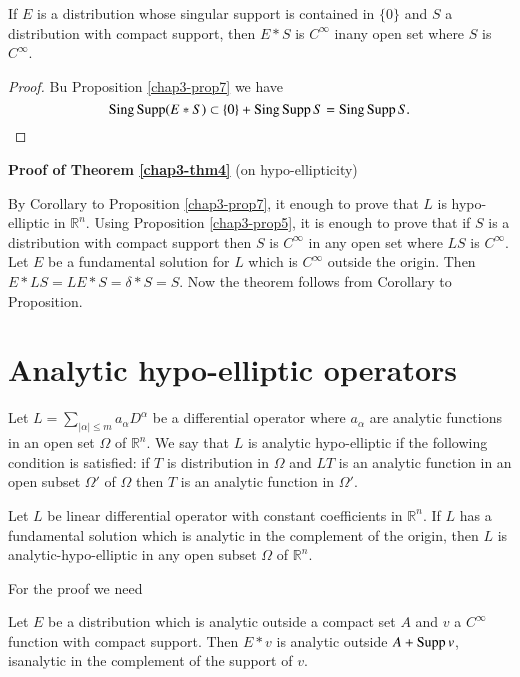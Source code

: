 \begin{coro*}
If $E$ is a distribution whose singular support is contained in
$\{0\}$ and $S$ a distribution with compact support, then $E\ast S$ is
$C^{\infty}$ in\pageoriginale any open set where $S$ is $C^{\infty}$.
\end{coro*}

\begin{proof}
Bu Proposition \ref{chap3-prop7} we have
$$
\operatorname{Sing} \operatorname{Supp} (E\ast S)\subset \{0\}+\operatorname{Sing} \operatorname{Supp} S=\operatorname{Sing} \operatorname{Supp} S.
$$
\end{proof}

\noindent
{\bf Proof of Theorem \ref{chap3-thm4}} (on hypo-ellipticity)

By Corollary to Proposition \ref{chap3-prop7}, it enough to prove that
$L$ is hypo-elliptic in $\mathbb{R}^{n}$. Using Proposition
\ref{chap3-prop5}, it is enough to prove that if $S$ is a distribution
with compact support then $S$ is $C^{\infty}$ in any open set where
$LS$ is $C^{\infty}$. Let $E$ be a fundamental solution for $L$ which
is $C^{\infty}$ outside the origin. Then $E\ast LS=LE\ast S=\delta\ast
S=S$. Now the theorem follows from Corollary to Proposition.

\section*{Analytic hypo-elliptic operators}

\begin{defi*}
Let $L=\sum\limits_{|\alpha|\leq m}a_{\alpha}D^{\alpha}$ be a
differential operator where $a_{\alpha}$ are analytic functions in an
open set $\Omega$ of $\mathbb{R}^{n}$. We say that $L$ is analytic
hypo-elliptic if the following condition is satisfied: if $T$ is
distribution in $\Omega$ and $LT$ is an analytic function in an open
subset $\Omega'$ of $\Omega$ then $T$ is an analytic function in $\Omega'$.
\end{defi*}

\begin{theorem}\label{chap3-thm7}
Let $L$ be linear differential operator with constant coefficients in
$\mathbb{R}^{n}$. If $L$ has a fundamental solution which is analytic
in the complement of the origin, then $L$ is analytic-hypo-elliptic in
any open subset $\Omega$ of $\mathbb{R}^{n}$.
\end{theorem}

For the proof we need

\begin{proposition}\label{chap3-prop8}
Let $E$ be a distribution which is analytic outside a compact set $A$
and $v$ a $C^{\infty}$ function with compact support. Then $E\ast v$
is analytic outside $A+\operatorname{Supp} v$, is\pageoriginale analytic in the
complement of the support of $v$.
\end{proposition}

